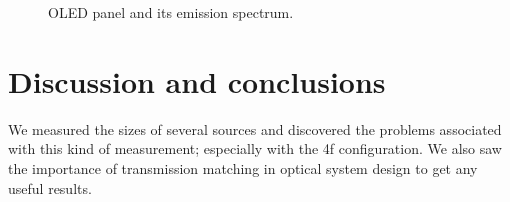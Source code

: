 \documentclass[a4paper, 12pt]{paper}
\begin{document}
\begin{figure}[H]
\begin{subfigure}[p]{0.45\textwidth}
    \end{subfigure}
    \caption{OLED panel and its emission spectrum.}
\label{fig:oled}
\end{figure}

\section{Discussion and conclusions}
We measured the sizes of several sources and discovered the problems associated with this kind of measurement; especially with the 4f configuration.
We also saw the importance of transmission matching in optical system design to get any useful results.
\end{document}
